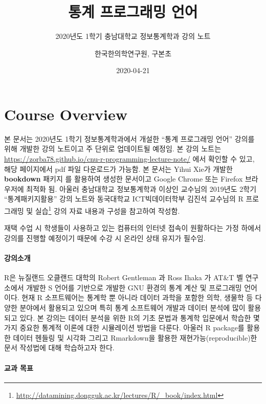 \documentclass[
  11pt,
]{krantz}
\title{통계 프로그래밍 언어}
\subtitle{2020년도 1학기 충남대학교 정보통계학과 강의 노트}
\author{한국한의학연구원, 구본초}
\date{2020-04-21}
\renewcommand{\href}[2]{#2\footnote{\url{#1}}}
\let\BeginKnitrBlock\begin \let\EndKnitrBlock\end
\begin{document}
\maketitle

{
\hypersetup{linkcolor=}
\setcounter{tocdepth}{2}
\tableofcontents
}
\listoftables
\listoffigures
\hypertarget{overview}{%
\chapter*{Course Overview}\label{overview}}


\BeginKnitrBlock{rmdnote}
본 문서는 2020년도 1학기 정보통계학과에서 개설한 ``통계 프로그래밍 언어'' 강의를 위해 개발한 강의 노트이고 주 단위로 업데이트될 예정임. 본 강의 노트는 \url{https://zorba78.github.io/cnu-r-programming-lecture-note/} 에서 확인할 수 있고, 해당 페이지에서 pdf 파일 다운로드가 가능함. 본 문서는 Yihui Xie가 개발한 \textbf{bookdown} 패키지 \citep{xie-2016}를 활용하여 생성한 문서이고 Google Chrome 또는 Firefox 브라우저에 최적화 됨. 아울러 충남대학교 정보통계학과 이상인 교수님의 2019년도 2학기 ``통계패키지활용'' 강의 노트와 동국대학교 ICT빅데이터학부 김진석 교수님의 \href{http://datamining.dongguk.ac.kr/lectures/R/_book/index.html}{R 프로그래밍 및 실습} 강의 자료 내용과 구성을 참고하여 작성함.

재택 수업 시 학생들이 사용하고 있는 컴퓨터의 인터넷 접속이 원활하다는 가정 하에서 강의를 진행할 예정이기 때문에 수강 시 온라인 상태 유지가 필수임.
\EndKnitrBlock{rmdnote}

\hypertarget{intro-lec}{%
\subsubsection*{강의소개}\label{intro-lec}}


R은 뉴질랜드 오클랜드 대학의 Robert Gentleman 과 Ross Ihaka 가 AT\&T 벨 연구소에서 개발한 S 언어를 기반으로 개발한 GNU 환경의 통계 계산 및 프로그래밍 언어이다. 현재 R 소프트웨어는 통계학 뿐 아니라 데이터 과학을 포함한 의학, 생물학 등 다양한 분야에서 활용되고 있으며 특히 통계 소프트웨어 개발과 데이터 분석에 많이 활용되고 있다. 본 강의는 데이터 분석을 위한 R의 기초 문법과 통계학 입문에서 학습한 몇 가지 중요한 통계적 이론에 대한 시뮬레이션 방법을 다룬다. 아울러 R package를 활용한 데이터 헨들링 및 시각화 그리고 Rmarkdown을 활용한 재현가능(reproducible)한 문서 작성법에 대해 학습하고자 한다.

\hypertarget{purpose-course}{%
\subsubsection*{교과 목표}\label{purpose-course}}
\end{document}
